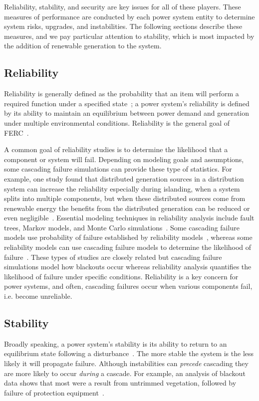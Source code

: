 Reliability, stability, and security are key issues for all of these players.  These measures of performance are conducted by each power system entity to determine system risks, upgrades, and instabilities.  The following sections describe these measures, and we pay particular attention to stability, which is most impacted by the addition of renewable generation to the system.

\subsection{Reliability}

Reliability is generally defined as the probability that an item will perform a required function under a specified state~\cite{reliability_def}; a power system's reliability is defined by its ability to maintain an equilibrium between power demand and generation under multiple environmental conditions.  Reliability is the general goal of FERC~\cite{power_reliability}.

A common goal of reliability studies is to determine the likelihood that a component or system will fail.  Depending on modeling goals and assumptions, some cascading failure simulations can provide these type of statistics.  For example, one study found that distributed generation sources in a distribution system can increase the reliability especially during islanding, when a system splits into multiple components, but when these distributed sources come from renewable energy the benefits from the distributed generation can be reduced or even negligible~\cite{dg_reliability}.  Essential modeling techniques in reliability analysis include fault trees, Markov models, and Monte Carlo simulations~\cite{power_reliability}.  Some cascading failure models use probability of failure established by reliability models~\cite{hidden_failures}, whereas some reliability models can use cascading failure models to determine the likelihood of failure~\cite{hines_ig}.  These types of studies are closely related but cascading failure simulations model how blackouts occur whereas reliability analysis quantifies the likelihood of failure under specific conditions.  Reliability is a key concern for power systems, and often, cascading failures occur when various components fail, i.e. become unreliable.

\subsection{Stability}
\label{stability}
Broadly speaking, a power system's stability is its ability to return to an equilibrium state following a disturbance~\cite{kundur}.  The more stable the system is the less likely it will propagate failure.  Although instabilities can \textit{precede} cascading they are more likely to occur \textit{during} a cascade.  For example, an analysis of blackout data shows that most were a result from untrimmed vegetation, followed by failure of protection equipment~\cite{donde}.

